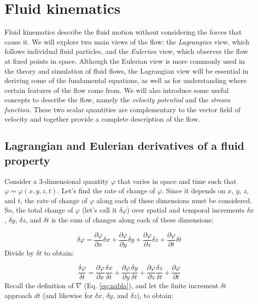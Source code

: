 \documentclass[12pt]{article}
\numberwithin{equation}{section}
\numberwithin{figure}{section}
\numberwithin{table}{section}
\begin{document}
\newpage
\section{Fluid kinematics}

Fluid kinematics describe the fluid motion without considering the forces that
cause it.
We will explore two main views of the flow: the \textit{Lagrangian}
view, which follows individual fluid particles, and the \textit{Eulerian}
view, which observes the flow at fixed points in space.
Although the Eulerian view is more commonly used in the theory and simulation
of fluid flows, the Lagrangian view will be essential in deriving some of the
fundamental equations, as well as for understanding where certain features of
the flow come from.
We will also introduce some useful concepts to describe the flow, namely
the \textit{velocity potential} and the \textit{stream function}.
These two scalar quantities are complementary to the vector field of velocity
and together provide a complete description of the flow.

\subsection{Lagrangian and Eulerian derivatives of a fluid property}

Consider a 3-dimensional quantity $\varphi$ that varies in space and time such that
$\varphi = \varphi(x, y, z, t)$.
Let's find the rate of change of $\varphi$.
Since it depends on $x$, $y$, $z$, and $t$, the rate of change of $\varphi$ along
each of these dimensions must be considered.
So, the total change of $\varphi$ (let's call it $\delta\varphi$) over spatial and
temporal increments $\delta x$, $\delta y$, $\delta z$, and $\delta t$ is the
sum of changes along each of these dimensions:

\begin{equation}
  \delta\varphi = \frac{\partial \varphi}{\partial x} \delta x +
    \frac{\partial \varphi}{\partial y} \delta y +
    \frac{\partial \varphi}{\partial z} \delta z +
    \frac{\partial \varphi}{\partial t} \delta t
\end{equation}
Divide by $\delta t$ to obtain:

\begin{equation}
  \frac{\delta\varphi}{\delta t} = \frac{\partial \varphi}{\partial x} \frac{\delta x}{\delta t} +
    \frac{\partial \varphi}{\partial y} \frac{\delta y}{\delta t} +
    \frac{\partial \varphi}{\partial z} \frac{\delta z}{\delta t} +
    \frac{\partial \varphi}{\partial t}
\end{equation}
Recall the definition of $\nabla$ (Eq. \ref{eq:nabla}), and let the finite
increment $\delta t$ approach $dt$ (and likewise for $\delta x$, $\delta y$, and
$\delta z$), to obtain:
\end{document}
